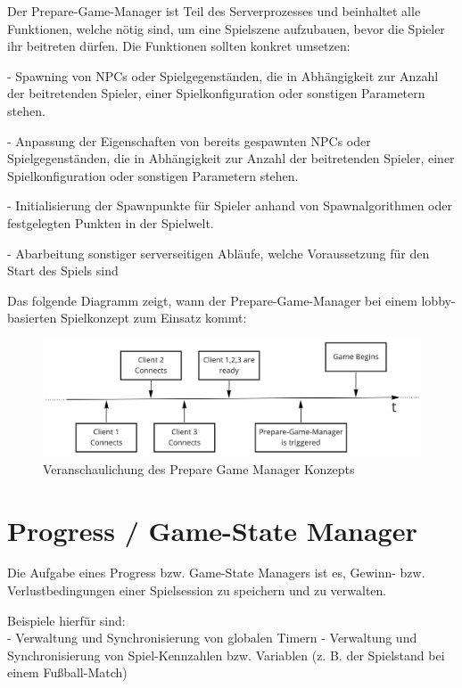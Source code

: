 Der Prepare-Game-Manager ist Teil des Serverprozesses und beinhaltet alle Funktionen, welche nötig sind, um eine Spielszene aufzubauen, bevor die Spieler ihr beitreten dürfen. Die Funktionen sollten konkret umsetzen:

- Spawning \cite{Wikipedia.2020} von NPCs \cite{Wikipedia.2021f} oder Spielgegenständen, die in Abhängigkeit zur Anzahl der beitretenden Spieler, einer Spielkonfiguration oder sonstigen Parametern stehen.

- Anpassung der Eigenschaften von bereits gespawnten NPCs oder Spielgegenständen, die in Abhängigkeit zur Anzahl der beitretenden Spieler, einer Spielkonfiguration oder sonstigen Parametern stehen.

- Initialisierung der Spawnpunkte für Spieler anhand von Spawnalgorithmen oder festgelegten Punkten in der Spielwelt.

- Abarbeitung sonstiger serverseitigen Abläufe, welche Voraussetzung für den Start des Spiels sind

Das folgende Diagramm zeigt, wann der Prepare-Game-Manager bei einem lobby-basierten Spielkonzept zum Einsatz kommt:

\begin{figure}[H]
	\centering
	\includegraphics[width=150mm]{images/prepare_game_manager.jpg}
	\caption[Prepare-Game-Manager]{Veranschaulichung des Prepare Game Manager Konzepts}
	\label{pic:prepare_game_manager}
\end{figure}

\section{Progress / Game-State Manager}
\label{progress_manager}

Die Aufgabe eines Progress bzw. Game-State Managers ist es, Gewinn- bzw. Verlustbedingungen einer Spielsession zu speichern und zu verwalten. 

Beispiele hierfür sind: \\
- Verwaltung und Synchronisierung von globalen Timern
- Verwaltung und Synchronisierung von Spiel-Kennzahlen bzw. Variablen (z. B. der Spielstand bei einem Fußball-Match)

